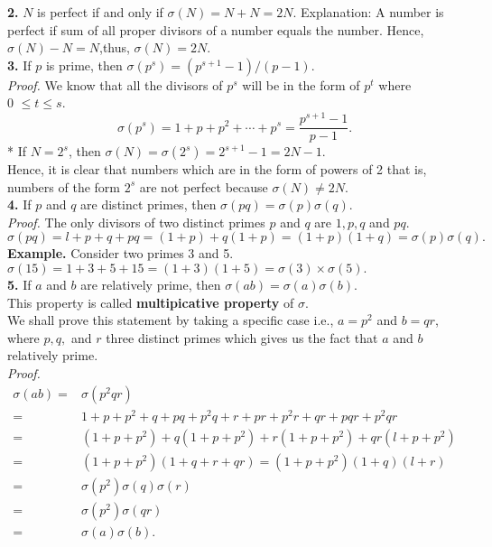\documentclass[a4paper,reqno,11pt]{book}
\theoremstyle{plain}%
\theoremstyle{definition}
\begin{document}
\textbf{2.} $N$ is perfect if and only if $\sigma(N) = N + N = 2N$. Explanation: A number is perfect if sum of all proper divisors of a number equals the number.
Hence, $\sigma(N) - N = N$,thus, $\sigma(N) = 2N.$\\
\textbf{3.} If $p$ is prime, then $\sigma(p^s) = (p^{s+1} - 1 )/(p - 1)$.\\
\textit{Proof.} We know that all the divisors of $p^s$ will be in the form of $p^t$ where\\ 0 $\leq t \leq s.$\\
$$\sigma(p^s) = 1 + p + p^2 + \cdots + p^s = \frac{p^{s+1} - 1}{p-1}. $$
* If $N = 2^s$, then
$\sigma(N) = \sigma(2^s) = 2^{s+1}-1 = 2N - 1.$\\
Hence, it is clear that numbers which are in the form of powers of 2 that is, numbers of the form $2^s$ are not perfect because $\sigma(N) \neq 2N.$\\
\textbf{4.} If $p$ and $q$ are distinct primes, then $\sigma(pq) = \sigma(p)\sigma(q)$. \\
\textit{Proof.} The only divisors of two distinct primes $p$ and $q$ are $1, p, q$
and $pq.$\\
 $\sigma(pq) = l + p + q + pq = (1+p) + q(1+p) = (1+p)(1+q) = \sigma(p)\sigma(q).$ \\
 \textbf{Example.} Consider two primes 3 and 5.\\
 $\sigma(15) = 1 + 3 + 5 + 15 = (1+3)(1+5) = \sigma(3) \times \sigma(5).$\\
\textbf{5.} If $a$ and $b$ are relatively prime, then $\sigma(ab) = \sigma(a)\sigma(b).$\\
This property is called \textbf{multipicative property} of $\sigma$.\\
We shall prove this statement by taking a specific case i.e.,
$a = p^2$ and $b = qr$, where $p, q,$ and $r$ three distinct primes which gives us the fact that $a$ and $b$ relatively prime.\\
\textit{Proof.}
\begin{align*}
\sigma(ab) =& \sigma(p^2qr) \\
=& 1 + p + p^2 + q + pq + p^2q + r + pr + p^2r + qr + pqr + p^2qr \\
=& (1 + p + p^2) + q(1 + p + p^2) + r(1 + p + p^2) + qr(l + p + p^2) \\
=& (1 + p + p^2)(1 + q + r + qr) = (1 + p + p^2)(1 + q)(l + r) \\
=& \sigma(p^2)\sigma(q)\sigma(r) \\
=& \sigma(p^2)\sigma(qr)\\
=& \sigma(a)\sigma(b).
\end{align*}
\end{document}
